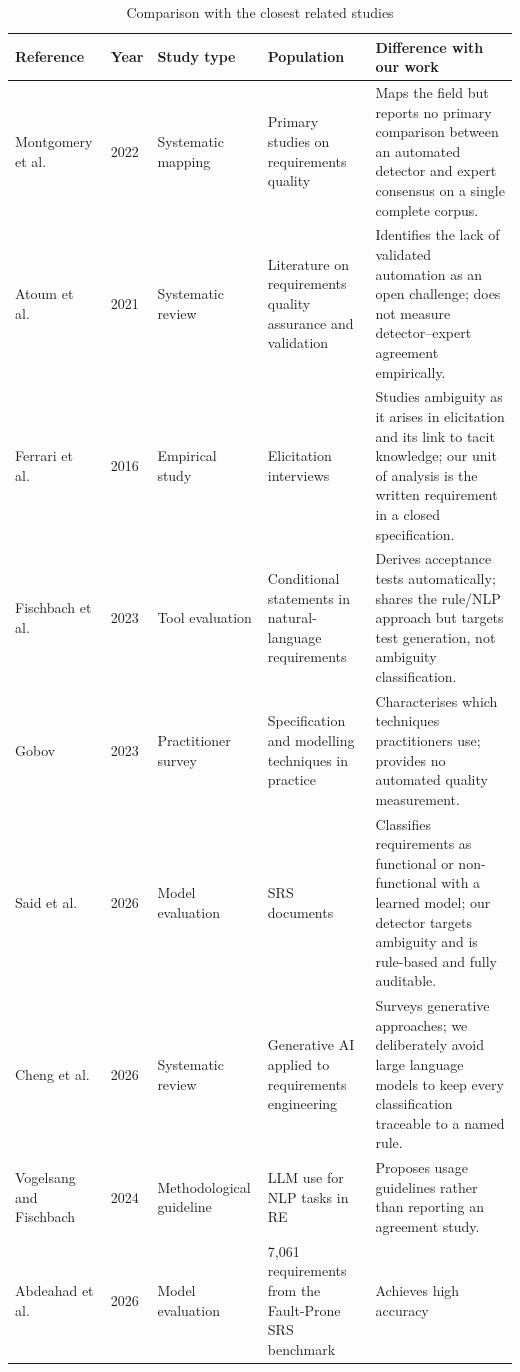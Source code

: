 \documentclass[pdflatex,sn-mathphys-num]{sn-jnl}
\theoremstyle{thmstyleone}%
\theoremstyle{thmstyletwo}%
\theoremstyle{thmstylethree}%
\begin{document}
\begin{table}[h]
\caption{Comparison with the closest related studies}\label{tab:related}
\begin{tabular}{@{}p{2.1cm}p{0.7cm}p{2.2cm}p{2.4cm}p{4.0cm}@{}}
\toprule
Reference & Year & Study type & Population & Difference with our work \\
\midrule
Montgomery et al.~\cite{montgomery2022} & 2022 & Systematic mapping &
Primary studies on requirements quality & Maps the field but reports no primary
comparison between an automated detector and expert consensus on a single
complete corpus. \\
Atoum et al.~\cite{atoum2021} & 2021 & Systematic review & Literature on
requirements quality assurance and validation & Identifies the lack of validated
automation as an open challenge; does not measure detector--expert agreement
empirically. \\
Ferrari et al.~\cite{ferrari2016} & 2016 & Empirical study & Elicitation
interviews & Studies ambiguity as it arises in elicitation and its link to tacit
knowledge; our unit of analysis is the written requirement in a closed
specification. \\
Fischbach et al.~\cite{fischbach2023} & 2023 & Tool evaluation & Conditional
statements in natural-language requirements & Derives acceptance tests
automatically; shares the rule/NLP approach but targets test generation, not
ambiguity classification. \\
Gobov~\cite{gobov2023} & 2023 & Practitioner survey & Specification and
modelling techniques in practice & Characterises which techniques practitioners
use; provides no automated quality measurement. \\
Said et al.~\cite{said2026} & 2026 & Model evaluation & SRS documents &
Classifies requirements as functional or non-functional with a learned model;
our detector targets ambiguity and is rule-based and fully auditable. \\
Cheng et al.~\cite{cheng2026} & 2026 & Systematic review & Generative AI applied
to requirements engineering & Surveys generative approaches; we deliberately
avoid large language models to keep every classification traceable to a named
rule. \\
Vogelsang and Fischbach~\cite{vogelsang2024} & 2024 & Methodological guideline &
LLM use for NLP tasks in RE & Proposes usage guidelines rather than reporting an
agreement study. \\
Abdeahad et al.~\cite{abdeahad2026} & 2026 & Model evaluation &
7,061 requirements from the Fault-Prone SRS benchmark & Achieves high accuracy

\end{tabular}
\end{table}
\end{document}
